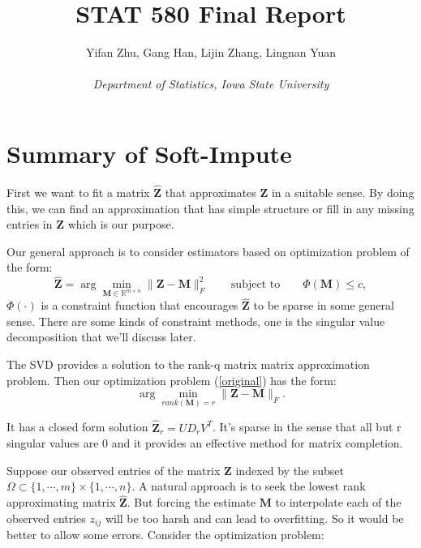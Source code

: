 \documentclass{article}
\begin{document}
	

	
	\title{\bf STAT 580 Final Report}
	\author{Yifan Zhu, Gang Han, Lijin Zhang, Lingnan Yuan\\ \  \\ \textit{Department of Statistics, Iowa State University}}
	\date{}
	\maketitle
	
	\section{Summary of Soft-Impute}
First we want to fit a matrix $\widehat{\mathbf{Z}}$ that approximates $\mathbf{Z}$ in a suitable sense. By doing this, we can find an approximation that has simple structure or fill in any missing entries in $\mathbf{Z}$ which is our purpose.\cite{hastie2015statistical}

Our general approach is to consider estimators based on optimization problem of the form:
\begin{equation}\label{original}
\widehat{\mathbf{Z}}= \arg \min_{\mathbf{M}\in \mathbb{R}^{m\times n}} \| \mathbf{Z} - \mathbf{M} \|^2_F \qquad \textrm{subject to} \qquad\Phi(\mathbf{M})\le c,
\end{equation}
$\Phi(\cdot)$ is a constraint function that encourages $\hat{\mathbf{Z}}$ to be sparse in some general sense. There are some kinds of constraint methods, one is the singular value decomposition that we'll discuss later.

The SVD provides a solution to the rank-q matrix matrix approximation problem. Then our optimization problem (\ref{original}) has the form:
\begin{equation}
\arg\min_{rank(\mathbf{M}) = r} \| \mathbf{Z} - \mathbf{M} \|_F.
\end{equation}

It has a closed form solution $\widehat{\mathbf{Z}}_r = UD_rV^T$. It's sparse in the sense that all but r singular values are 0 and it provides an effective method for matrix completion.

Suppose our observed entries of the matrix $\mathbf{Z}$ indexed by the subset $\Omega \subset \{1,\cdots,m\}\times \{1,\cdots,n\}$. A natural approach is to seek the lowest rank approximating matrix $\widehat{\mathbf{Z}}$.
But forcing the estimate $\mathbf{M}$ to interpolate each of the observed entries $z_{ij}$ will be too harsh and can lead to overfitting. So it would be better to allow some errors. Consider the optimization problem:
\end{document}
